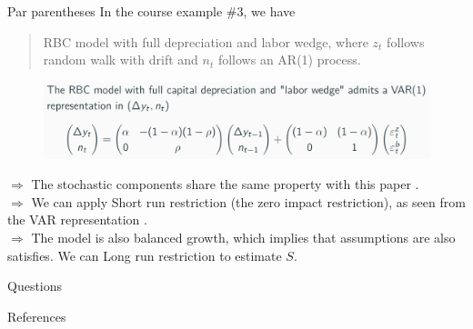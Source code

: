 \documentclass[10pt]{beamer}
\begin{document}
\begin{frame}{Par parentheses}
    In the course example \#3, we have
    \begin{quote}
        RBC model with full depreciation and labor wedge, where $z_t$ follows random walk with drift and $n_t$ follows an AR(1) process.
    \end{quote}
        \begin{figure}
        \centering
        \includegraphics[width=0.7\linewidth]{figures/example3.png}
    \end{figure}
    $\Longrightarrow$ The stochastic components share the same property with this paper \cite{cogley_nason_1995}.\\
    $\Longrightarrow$ We can apply \alert{Short run} restriction (the zero impact restriction), as seen from the VAR representation .\\
    $\Longrightarrow$ The model is also balanced growth, which implies that \cite{blanchard_quah_1988} assumptions are also satisfies. We can \alert{Long run} restriction to estimate $S$. \\
    

\end{frame}

{
\begin{frame}[standout]
  Questions
\end{frame}
}

\begin{frame}[allowframebreaks]{References}

    
    

\end{frame}
\end{document}
